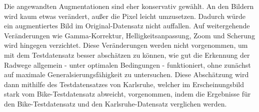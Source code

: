 Die angewandten Augmentationen sind eher konservativ gewählt. An den Bildern wird kaum etwas verändert, 
außer die Pixel leicht umzusetzen. Dadurch würde ein augmentiertes Bild im Original-Datensatz nicht auffallen. 
Auf weitergehende Veränderungen wie Gamma-Korrektur, Helligkeitsanpassung, Zoom und Scherung wird hingegen verzichtet. 
Diese Veränderungen werden nicht vorgenommen, um mit dem Testdatensatz besser abschätzen zu können, 
wie gut die Erkennung der Radwege allgemein - unter optimalen Bedingungen - funktioniert, ohne zunächst auf 
maximale Generalsierungsfähigkeit zu untersuchen. Diese Abschätzung wird dann mithilfe des Testdatensatzes von 
Karlsruhe, welcher im Erscheinungsbild stark vom Bike-Testdatensatz abweicht, vorgenommen, 
indem die Ergebnisse für den Bike-Testdatensatz und den Karlsruhe-Datensatz verglichen werden. 

